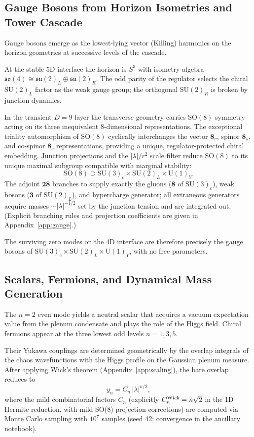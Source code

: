 \documentclass[11pt,a4paper,oneside]{article}
\begin{document}
\subsection{Gauge Bosons from Horizon Isometries and Tower Cascade}
Gauge bosons emerge as the lowest-lying vector (Killing) harmonics on the horizon geometries at successive levels of the cascade.

At the stable 5D interface the horizon is $S^3$ with isometry algebra $\mathfrak{so}(4) \cong \mathfrak{su}(2)_L \oplus \mathfrak{su}(2)_R$. The odd parity of the regulator selects the chiral $\mathrm{SU}(2)_L$ factor as the weak gauge group; the orthogonal $\mathrm{SU}(2)_R$ is broken by junction dynamics.

In the transient $D=9$ layer the transverse geometry carries $\mathrm{SO}(8)$ symmetry acting on its three inequivalent 8-dimensional representations. The exceptional triality automorphism of $\mathrm{SO}(8)$ cyclically interchanges the vector $\mathbf{8}_v$, spinor $\mathbf{8}_s$, and co-spinor $\mathbf{8}_c$ representations, providing a unique, regulator-protected chiral embedding. Junction projections and the $|\lambda|/r^2$ scale filter reduce $\mathrm{SO}(8)$ to its unique maximal subgroup compatible with marginal stability:
\[
\mathrm{SO}(8) \supset \mathrm{SU}(3)_c \times \mathrm{SU}(2)_L \times \mathrm{U}(1)_Y.
\]
The adjoint $\mathbf{28}$ branches to supply exactly the gluons ($\mathbf{8}$ of $\mathrm{SU}(3)_c$), weak bosons ($\mathbf{3}$ of $\mathrm{SU}(2)_L$), and hypercharge generator; all extraneous generators acquire masses $\sim |\lambda|^{-1/2}$ set by the junction tension and are integrated out. (Explicit branching rules and projection coefficients are given in Appendix~\ref{app:gauge}.)

The surviving zero modes on the 4D interface are therefore precisely the gauge bosons of $\mathrm{SU}(3)_c \times \mathrm{SU}(2)_L \times \mathrm{U}(1)_Y$, with no free parameters.

\subsection{Scalars, Fermions, and Dynamical Mass Generation}

The $n=2$ even mode yields a neutral scalar that acquires a vacuum expectation value from the plenum condensate and plays the role of the Higgs field. Chiral fermions appear at the three lowest odd levels $n=1,3,5$. 

Their Yukawa couplings are determined geometrically by the overlap integrals of the chaos wavefunctions with the Higgs profile on the Gaussian plenum measure. After applying Wick's theorem (Appendix~\ref{app:scaling}), the bare overlap reduces to
\[
y_n = C_n \, |\lambda|^{n/2},
\]
where the mild combinatorial factors $C_n$ (explicitly $C_n^{\rm Wick} = n\sqrt{2}$ in the 1D Hermite reduction, with mild SO(8) projection corrections) are computed via Monte Carlo sampling with $10^7$ samples (seed 42; convergence in the ancillary notebook).
\end{document}
